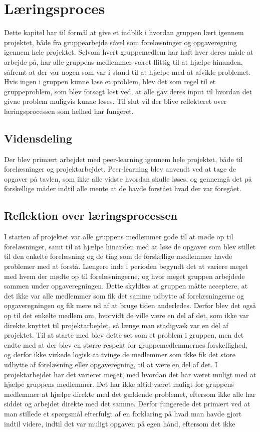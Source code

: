 \chapter{Læringsproces}\label{Laeringsproces}
Dette kapitel har til formål at give et indblik i hvordan gruppen lært igennem projektet, både fra gruppearbejde såvel som forelæsninger og opgaveregning igennem hele projektet. Selvom hvert gruppemedlem har haft hver deres måde at arbejde på, har alle gruppens medlemmer været flittig til at hjælpe hinanden, såfremt at der var nogen som var i stand til at hjælpe med at afvikle problemet. Hvis ingen i gruppen kunne løse et problem, blev det som regel til et gruppeproblem, som blev forsøgt løst ved, at alle gav deres input til hvordan det givne problem muligvis kunne løses. Til slut vil der blive reflekteret over læringsprocessen som helhed har fungeret.

\section{Vidensdeling}\label{Vidensdeling}
Der blev primært arbejdet med peer-learning igennem hele projektet, både til forelæsninger og projektarbejdet. Peer-learning blev anvendt ved at tage de opgaver på tavlen, som ikke alle vidste hvordan skulle løses, og gennemgå det på forskellige måder indtil alle mente at de havde forstået hvad der var foregået.

\section{Reflektion over læringsprocessen}\label{Reflektion-over-laeringsprocessen}
I starten af projektet var alle gruppens medlemmer gode til at møde op til forelæsninger, samt til at hjælpe hinanden med at løse de opgaver som blev stillet til den enkelte forelæsning og de ting som de forskellige medlemmer havde problemer med at forstå. Længere inde i perioden begyndt det at variere meget med hvem der mødte op til forelæsningerne, og hvor meget gruppen arbejdede sammen under opgaveregningen. Dette skyldtes at gruppen måtte acceptere, at det ikke var alle medlemmer som fik det samme udbytte af forelæsningerne og opgaveregningen og fik mere ud af at bruge tiden anderledes. Derfor blev det også op til det enkelte medlem om, hvorvidt de ville være en del af det, som ikke var direkte knyttet til projektarbejdet, så længe man stadigvæk var en del af projektet. Til at starte med blev dette set som et problem i gruppen, men det endte med at der blev en større respekt for gruppemedlemmernes forskellighed, og derfor ikke virkede logisk at tvinge de medlemmer som ikke fik det store udbytte af forelæsning eller opgaveregning, til at være en del af det.
	I projektarbejdet har det varieret meget, med hvordan det har været muligt med at hjælpe gruppens medlemmer. Det har ikke altid været muligt for gruppens medlemmer at hjælpe direkte med det gældende problemet, eftersom ikke alle har siddet og arbejdet direkte med det samme. Derfor fungerede det primært ved at man stillede et spørgsmål efterfulgt af en forklaring på hvad man havde gjort indtil videre, indtil det var muligt  opgaven på egen hånd, eftersom det ikke 